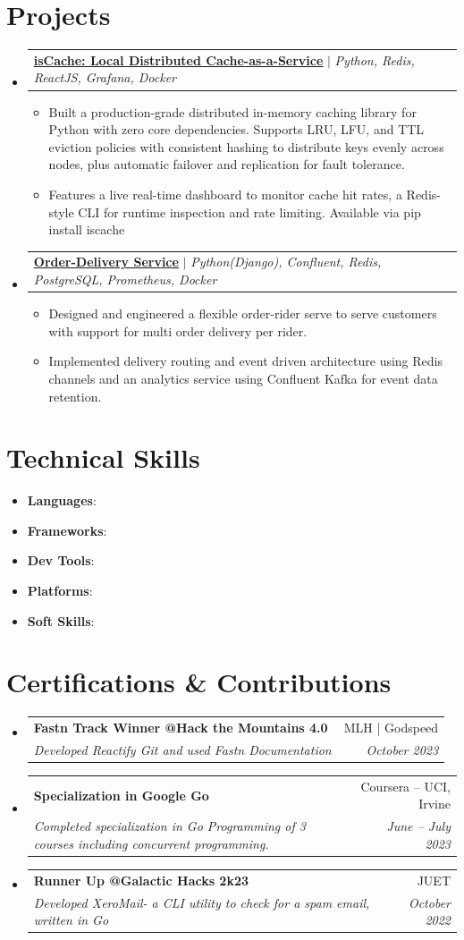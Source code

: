 \documentclass[letterpaper,10.9pt]{article}
\makeatletter
\newcommand{\resumeItem}[1]{
  \item\small{
    {#1 \vspace{-2pt}}
  }
}
\newcommand{\resumeSubheading}[4]{
  \vspace{-2pt}\item
    \begin{tabular*}{0.97\textwidth}[t]{l@{\extracolsep{\fill}}r}
      \textbf{#1} & #2 \\
      \textit{\small#3} & \textit{\small #4} \\
    \end{tabular*}\vspace{-7pt}
}
\newcommand{\resumeProjectHeading}[2]{
    \item
    \begin{tabular*}{0.97\textwidth}{l@{\extracolsep{\fill}}r}
      \small#1 & #2 \\
    \end{tabular*}\vspace{-7pt}
}
\newcommand{\resumeSubItem}[1]{\resumeItem{#1}\vspace{-4pt}}
\newcommand{\resumeSubHeadingListStart}{\begin{itemize}[leftmargin=0.15in, label={}]}
\newcommand{\resumeSubHeadingListEnd}{\end{itemize}}
\newcommand{\resumeItemListStart}{\begin{itemize}}
\newcommand{\resumeItemListEnd}{\end{itemize}\vspace{-5pt}}
\makeatother
\begin{document}
\section{Projects}
    \resumeSubHeadingListStart
      \resumeProjectHeading
          {\textbf{\underline{\href{https://iscache.vercel.app}{isCache: Local Distributed Cache-as-a-Service}}} $|$ \emph{Python, Redis, ReactJS, Grafana, Docker}}{}
          \resumeItemListStart
            \resumeItem{Built a production-grade distributed in-memory caching library for Python with zero core dependencies. Supports LRU, LFU, and TTL eviction policies with consistent hashing to distribute keys evenly across nodes, plus automatic failover and replication for fault tolerance.}
            \resumeItem{Features a live real-time dashboard to monitor cache hit rates, a Redis-style CLI for runtime inspection and rate limiting. Available via pip install iscache}
          \resumeItemListEnd
      \resumeProjectHeading
          {\textbf{\underline{\href{https://github.com/047pegasus/rider-service}{Order-Delivery Service}}} $|$ \emph{Python(Django), Confluent, Redis, PostgreSQL, Prometheus, Docker}}{}
          \resumeItemListStart
            \resumeItem{Designed and engineered a flexible order-rider serve to serve customers with support for multi order delivery per rider.}
            \resumeItem{Implemented delivery routing and event driven architecture using Redis channels and an analytics service using Confluent Kafka for event data retention.}
          \resumeItemListEnd
    \resumeSubHeadingListEnd

\section{Technical Skills}
     \resumeSubHeadingListStart
     \resumeSubItem{\textbf{Languages}:}{~~~~ Python, C++, C, Go, SQL, JavaScript, BASH, HTML/CSS} \\
     \resumeSubItem{\textbf{Frameworks}:}{~~ Django, FastAPI, Gin, Express, NestJS} \\
     \resumeSubItem{\textbf{Dev Tools}:}{~~~~~ Docker Stack (Compose \& Swarm), Jenkins, AWS, Supabase} \\
     \resumeSubItem{\textbf{Platforms}:}{~~~~~ Linux, Web, Windows, AWS}
     \resumeSubItem{\textbf{Soft Skills}:}{~~~~~ Leadership, Management, Public Speaking}
\resumeSubHeadingListEnd

\section{Certifications \& Contributions}
  \resumeSubHeadingListStart
    \resumeSubheading
      {Fastn Track Winner @Hack the Mountains 4.0}{MLH | Godspeed}
      {Developed Reactify Git and used Fastn Documentation}{October 2023}
    \resumeSubheading
      {Specialization in Google Go}{Coursera -- UCI, Irvine}
      {Completed specialization in Go Programming of 3 courses including concurrent programming.}{June -- July 2023}
    \resumeSubheading
      {Runner Up @Galactic Hacks 2k23}{JUET}
      {Developed XeroMail- a CLI utility to check for a spam email, written in Go}{October 2022}
  \resumeSubHeadingListEnd
\end{document}
